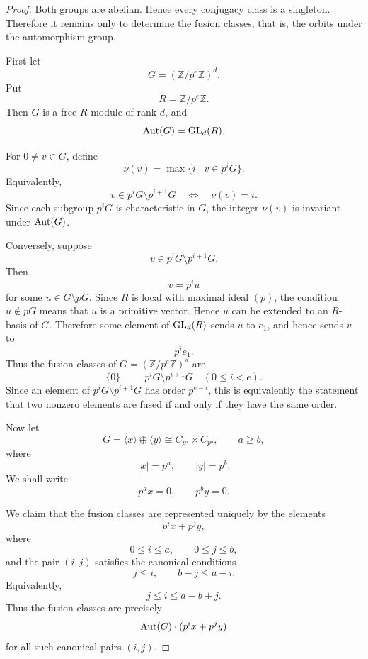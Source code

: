     \begin{proof}
    Both groups are abelian. Hence every conjugacy class is a singleton.
    Therefore it remains only to determine the fusion classes, that is, the
    orbits under the automorphism group.
    
    First let
    \[
        G=(\mathbb Z/p^e\mathbb Z)^d.
    \]
    Put
    \[
        R=\mathbb Z/p^e\mathbb Z.
    \]
    Then \(G\) is a free \(R\)-module of rank \(d\), and
    \[
        \operatorname{Aut}(G)=\operatorname{GL}_d(R).
    \]
    
    For \(0\neq v\in G\), define
    \[
        \nu(v)=\max\{i\mid v\in p^iG\}.
    \]
    Equivalently,
    \[
        v\in p^iG\setminus p^{i+1}G
        \quad\Longleftrightarrow\quad
        \nu(v)=i.
    \]
    Since each subgroup \(p^iG\) is characteristic in \(G\), the integer
    \(\nu(v)\) is invariant under \(\operatorname{Aut}(G)\).
    
    Conversely, suppose
    \[
        v\in p^iG\setminus p^{i+1}G.
    \]
    Then
    \[
        v=p^i u
    \]
    for some \(u\in G\setminus pG\). Since \(R\) is local with maximal ideal
    \((p)\), the condition \(u\notin pG\) means that \(u\) is a primitive vector.
    Hence \(u\) can be extended to an \(R\)-basis of \(G\). Therefore some element
    of \(\operatorname{GL}_d(R)\) sends \(u\) to \(e_1\), and hence sends \(v\) to
    \[
        p^i e_1.
    \]
    Thus the fusion classes of \(G=(\mathbb Z/p^e\mathbb Z)^d\) are
    \[
        \{0\},
        \qquad
        p^iG\setminus p^{i+1}G
        \quad (0\leq i<e).
    \]
    Since an element of \(p^iG\setminus p^{i+1}G\) has order \(p^{e-i}\), this is
    equivalently the statement that two nonzero elements are fused if and only if
    they have the same order.
    
    Now let
    \[
        G=\langle x\rangle\oplus \langle y\rangle
        \cong C_{p^a}\times C_{p^b},
        \qquad a\geq b,
    \]
    where
    \[
        |x|=p^a,
        \qquad
        |y|=p^b.
    \]
    We shall write
    \[
        p^a x=0,
        \qquad
        p^b y=0.
    \]
    
    We claim that the fusion classes are represented uniquely by the elements
    \[
        p^i x+p^j y,
    \]
    where
    \[
        0\leq i\leq a,
        \qquad
        0\leq j\leq b,
    \]
    and the pair \((i,j)\) satisfies the canonical conditions
    \[
        j\leq i,
        \qquad
        b-j\leq a-i.
    \]
    Equivalently,
    \[
        j\leq i\leq a-b+j.
    \]
    Thus the fusion classes are precisely
    \[
        \operatorname{Aut}(G)\cdot (p^i x+p^j y)
    \]
    for all such canonical pairs \((i,j)\).
    

\end{proof}
